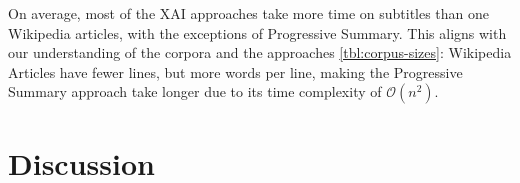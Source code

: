 On average, most of the XAI approaches take more time on subtitles than one Wikipedia articles, with the exceptions of Progressive Summary.
This aligns with our understanding of the corpora and the approaches \ref{tbl:corpus-sizes}:
Wikipedia Articles have fewer lines, but more words per line, making the Progressive Summary approach take longer due to its time complexity of $\mathcal{O}(n^2)$.


\section{Discussion}

